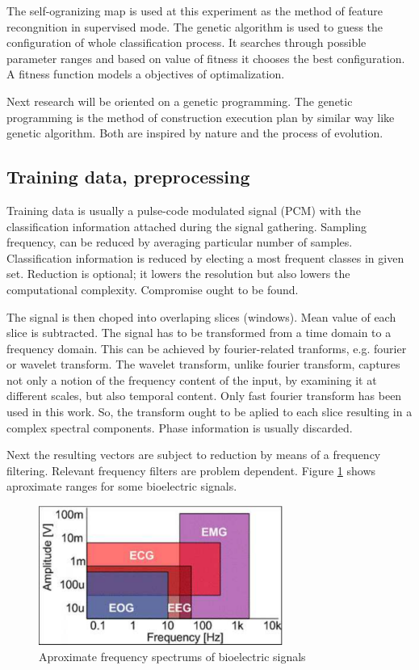 \documentclass[a4paper,jurnal]{IEEEtran}
\begin{document}
The self-ogranizing map is used  at this experiment as the method of feature recongnition in 
supervised mode. The genetic algorithm is used to guess the configuration of 
whole classification process. It searches through possible parameter ranges and 
based on value of fitness it chooses the best configuration. A fitness function
models a objectives of optimalization.

Next research will be oriented on a genetic programming. The genetic programming 
is the method of construction execution plan by similar way like genetic
algorithm. Both are inspired by nature and the process of evolution.


\subsection{Training data, preprocessing}
Training data is usually a pulse-code modulated signal (PCM) \cite{pcm} with the
classification information attached during the signal gathering.
Sampling frequency,
can be reduced by averaging particular number of samples. Classification
information is reduced by electing a most frequent classes in given set.
Reduction is optional; it lowers the resolution but also lowers the 
computational complexity. Compromise ought to be found.

The signal is then choped into overlaping slices (windows). 
Mean value of each slice is subtracted. %
The signal has to be transformed %
from a time domain to a frequency domain.
This can be achieved by fourier-related tranforms, e.g. fourier or wavelet transform\cite{fourier,wavelet}.
The wavelet transform, unlike fourier transform, captures not only a notion of the 
frequency content of the input,
by examining it at different scales, but also temporal content.
Only fast fourier transform has been used in this work.
So, the transform ought to be aplied to each slice resulting in
a complex spectral components.
Phase information is usually discarded.

Next the resulting vectors are subject to reduction by means of a
frequency filtering. Relevant frequency filters are problem dependent.
Figure \ref{filters} shows aproximate ranges for some bioelectric signals.
\begin{figure}[h]
	\centering
	\includegraphics[width=80mm]{filters}
	\caption{Aproximate frequency spectrums of bioelectric signals}
	\label{filters}
\end{figure}
\end{document}

